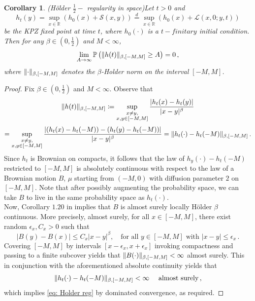 \documentclass[12pt]{report}
\theoremstyle{plain}
\newtheorem{corollary}{Corollary}[section]
\newcommand{\R}{\ensuremath{\mathbb{R}}}
\newcommand{\PP}{\ensuremath{\mathbb{P}}}
\begin{document}
\begin{corollary}{(H\"{o}lder $\frac{1}{2}-$ regularity in space)}\label{cor: Holder reg}
Let $t>0$ and 
\[
h_t(y) = \sup_{x\in\R}(h_0(x)+\mathcal{S}(x,y)) \stackrel{d}{=} \sup_{x\in\R}(h_0(x)+\mathcal{L}(x,0;y,t))
\]
be the KPZ fixed point at time $t$, where $h_0(\cdot)$ is a $t-finitary$ initial condition. Then for any $\beta\in (0,\frac{1}{2})$ and $M<\infty$, 
\begin{equation}\label{eq: Holder reg}
\displaystyle\lim_{A\to\infty}\PP\left( \lVert h(t)\rVert_{\beta,\space [-M,M]}\geq A\right) = 0\,,
\end{equation}
where $\lVert \cdot \rVert_{\beta,\space [-M,M]}$ denotes the $\beta$-Holder norm on the interval $[-M,M]$.
\end{corollary}

\begin{proof}
    Fix $\beta\in (0,\frac{1}{2})$ and $M<\infty$. Observe that
    \[
    \lVert h(t)\rVert_{\beta,\space [-M,M]} \coloneqq 
    \sup_{\substack{x\neq y,\\x,y\in [-M,M]}}\frac{|h_t(x)-h_t(y)|}{|x-y|^\beta}
    \]
    \[
    = \sup_{\substack{x\neq y,\\x,y\in [-M,M]}}\frac{|(h_t(x)-h_t(-M))-(h_t(y)-h_t(-M))|}{|x-y|^\beta} = \lVert h_t(\cdot)-h_t(-M)\rVert_{\beta,\space [-M,M]}\,.
    \]
    Since $h_t$ is Brownian on compacts, it follows that the law of $h_y(\cdot)-h_t(-M)$ restricted to $[-M,M]$ is absolutely continuous with respect to the law of a Brownian motion $B$, $\mu$ starting from $(-M,0)$ with diffusion parameter $2$ on $[-M,M]$. Note that after possibly augmenting the probability space, we can take $B$ to live in the same probability space as $h_t(\cdot)$.\\

    Now, Corollary $1.20$ in \cite{morters2010brownian} implies that $B$ is almost surely locally H\"{o}lder $\beta$ continuous. More precisely,
    almost surely, for all $x\in[-M,M]$, there exist random $\epsilon_x, C_x >0$ such that
    \[
    |B(y)-B(x)|\leq C_x |x-y|^\beta, \quad \text{for all } y\in[-M,M] \text{ with } |x-y|\leq \epsilon_x\,.
    \]
    \noindent Covering $[-M, M]$ by intervals $[x-\epsilon_x, x+\epsilon_x]$ invoking compactness and passing to a finite subcover yields that
    $\lVert B(\cdot)\rVert_{\beta,\space [-M,M]} < \infty$ almost surely. This in conjunction with the aforementioned absolute continuity yields that
    \[
    \lVert h_t(\cdot)-h_t(-M)\rVert_{\beta,\space [-M,M]}<\infty \quad \text{ almost surely}\,,
    \]
    which implies \ref{eq: Holder reg} by dominated convergence, as required.
    
\end{proof}
\end{document}
